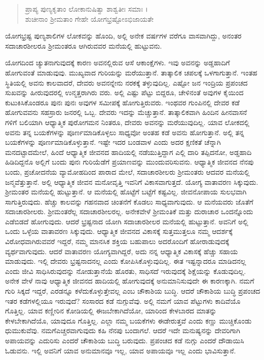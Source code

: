 \begin{verse}
ಪ್ರಾಪ್ಯ ಪುಣ್ಯಕೃತಾಂ ಲೋಕಾನುಷಿತ್ವಾ ಶಾಶ್ವತೀಃ ಸಮಾಃ ।\\ಶುಚೀನಾಂ ಶ್ರೀಮತಾಂ ಗೇಹೇ ಯೋಗಭ್ರಷ್ಟೋಽಭಿಜಾಯತೇ 
\end{verse}

{\small ಯೋಗಭ್ರಷ್ಟ ಪುಣ್ಯಶಾಲಿಗಳ ಲೋಕವನ್ನು ಹೊಂದಿ, ಅಲ್ಲಿ ಅನೇಕ ವರ್ಷಗಳ ವರೆಗೂ ವಾಸವಾಗಿದ್ದು, ಅನಂತರ ಸದಾಚಾರಶೀಲರೂ ಶ್ರೀಮಂತರೂ ಆಗಿರುವವರ ಮನೆಯಲ್ಲಿ ಹುಟ್ಟುವನು.}

ಯೋಗದಿಂದ ಚ್ಯುತನಾಗುವುದಕ್ಕೆ ಕಾರಣ ಅವನಲ್ಲಿರುವ ಆಸೆ ಆಕಾಂಕ್ಷೆಗಳು. ಇವು ಅವನನ್ನು ಅಡ್ಡಹಾದಿಗೆ ಹೋಗುವಂತೆ ಮಾಡುವುವು. ಮುಖ್ಯವಾದ ಗುರಿಯನ್ನು ಮರೆಯುತ್ತಾನೆ. ತಾತ್ಕಾಲಿಕ ಚಪಲಕ್ಕೆ ಒಳಗಾಗುತ್ತಾನೆ. ಇಂತಹ ಸ್ಥಿತಿಯಲ್ಲಿ ಅವನು ಕಾಲವಾದರೆ, ದೇವರು ಅವನನ್ನೇನು ನರಕಕ್ಕೆ ತಳ್ಳುವುದಿಲ್ಲ. ಎಷ್ಟೋ ಜನ ಇಂದ್ರಿಯ ಪ್ರಪಂಚದ ಸುಖವನ್ನು ಹೀರುವುದರಲ್ಲಿ ಉನ್ಮತ್ತರಾಗಿರು ವರು. ಅಲ್ಲಿ ಎಷ್ಟು ಪೆಟ್ಟು ಬಿದ್ದರೂ, ಚೇಳಿನಂತೆ ಅವುಗಳ ಕೈಯಿಂದ ಕುಟುಕಿಸಿಕೊಂಡರೂ ಪುನಃ ಪುನಃ ಅವುಗಳ ಸಮೀಪಕ್ಕೆ ಹೋಗುತ್ತಿರುವರು. ಇಂಥವರ ಗುಂಪಿನಲ್ಲಿ ದೇವರ ಕಡೆ ಹೋಗುವವನು ಸಹಸ್ರಾರು ಜನರಲ್ಲಿ ಒಬ್ಬ. ದೇವರು ಇದನ್ನು ಮೆಚ್ಚುತ್ತಾನೆ. ತಾತ್ಕಾಲಿಕವಾಗಿ ಹಿಂದಿನ ಹೀನವಾಸನೆ ಗಳಿಗೆ ಬಲಿಯಾಗಿ ಆಧ್ಯಾತ್ಮಿಕ ಪುರೋಗಮನ ನಿಂತರೂ, ದೇವರು ಅವನನ್ನು ಮರೆಯುವುದಿಲ್ಲ. ಯಾವ ಲೋಕದಲ್ಲಿ ಅವನು ತನ್ನ ಬಯಕೆಗಳನ್ನು ಪೂರ್ಣಮಾಡಿಕೊಳ್ಳಲು ಸಾಧ್ಯವೋ ಅಂತಹ ಕಡೆ ಅವನು ಹೋಗುತ್ತಾನೆ. ಅಲ್ಲಿ ತನ್ನ ಬಯಕೆಗಳನ್ನು ಪೂರ್ಣಮಾಡಿಕೊಳ್ಳುತ್ತಾನೆ. ಇಷ್ಟೇ ಇದರ ಬಂಡವಾಳ ಎಂದು ಅದರ ಕ್ಷಣಿಕತೆ ಚೆನ್ನಾಗಿ ಮನದಟ್ಟಾದಮೇಲೆ, ಹಿಂದೆ ಆಧ್ಯಾತ್ಮಿಕ ಜೀವನದ ಹಾದಿಯಲ್ಲಿ ನಡೆಯುತ್ತಿದ್ದಾಗ ಎಲ್ಲಿ ದಾರಿ ತಪ್ಪಿದನೋ, ಅಡ್ಡಹಾದಿ ಹಿಡಿದಿದ್ದನೊ ಅಲ್ಲಿಗೆ ಬಂದು ಪುನಃ ಗುರಿಯೆಡೆಗೆ ಪ್ರಯಾಣವನ್ನು ಮುಂದುವರಿಸುವನು. ಆಧ್ಯಾತ್ಮಿಕ ಜೀವನದ ನೆನಪು ಬಂದು, ಪ್ರಚೋದನೆಯ ವ್ಯಾಮೋಹದಿಂದ ಪಾರಾದ ಮೇಲೆ, ಸದಾಚಾರಶೀಲರು ಶ್ರೀಮಂತರು ಆದವರ ಮನೆಯಲ್ಲಿ ಜನ್ಮವೆತ್ತುತ್ತಾನೆ. ಅಲ್ಲಿ ಆಧ್ಯಾತ್ಮಿಕ ಜೀವನ ಮನೋವೃತ್ತಿ ಇವನಿಗೆ ವಿಕಾಸವಾಗುತ್ತದೆ. ಯೋಗ್ಯ ವಾತಾವರಣ ಸಿಕ್ಕುವುದು. ಶ್ರೀಮಂತರ ಮನೆಯಲ್ಲಿ ಹುಟ್ಟುತ್ತಾನೆ. ಆ ಮನೆಯಲ್ಲಿ ಹೊಟ್ಟೆಗೆ ಬಟ್ಟೆಗೆ ಕಷ್ಟವಿಲ್ಲ. ಜೀವನೋಪಾಯ ಸುಲಭವಾಗಿ ಸಾಗುತ್ತಿರುವುದು. ಹೆಚ್ಚು ಕಾಲವನ್ನು ಗಹನವಾದ ಚಿಂತನೆಗೆ ಕೊಡಲು ಸಾಧ್ಯವಾಗುವುದು. ಆ ಮನೆಯವರು ಜೊತೆಗೆ ಸದಾಚಾರಶೀಲರು. ಶ್ರೀಮಂತರೆಲ್ಲ ಸದಾಚಾರಶೀಲರಲ್ಲ. ಅನೇಕವೇಳೆ ಶ್ರೀಮಂತಿಕೆ ಮತ್ತು ದುರಾಚಾರ ಒಂದನ್ನೊಂದು ಎಡೆಬಿಡದೆ ಹೋಗುವುದು. ಆದರೆ ಭ್ರಷ್ಟನಾದ ಯೋಗಿ ಸದಾಚಾರಶೀಲರ ಮನೆಯಲ್ಲಿ ಹುಟ್ಟುತ್ತಾನೆ. ಅವನಿಗೆ ಅಲ್ಲಿ ಒಂದು ಒಳ್ಳೆಯ ವಾತಾವರಣ ಸಿಕ್ಕುವುದು. ಆಧ್ಯಾತ್ಮಿಕ ಜೀವನದ ವಿಕಾಸಕ್ಕೆ ಸುತ್ತಮುತ್ತಲೂ ನಮ್ಮ ಆದರ್ಶಕ್ಕೆ ವಿರೋಧವಾಗಿರುವವರೆ ಇದ್ದರೆ, ನಮ್ಮ ಮಾನಸಿಕ ಶಕ್ತಿಯ ಬಹುಪಾಲು ಅದರೊಂದಿಗೆ ಹೋರಾಡುವುದಕ್ಕೆ ವ್ಯರ್ಥವಾಗುವುದು. ಆದರೆ ವಾತಾವರಣ ಯೋಗ್ಯವಾಗಿದ್ದರೆ, ಅದು ನನ್ನ ಆಧ್ಯಾತ್ಮಿಕ ವಿಕಾಸಕ್ಕೆ ಹೆಚ್ಚು ಸಹಾಯ ಮಾಡುವುದು. ಇಲ್ಲಿ ದೇವರು ಭ್ರಷ್ಟನಾದನಲ್ಲ ಎಂದು ಕೋಪಿಸಿಕೊಳ್ಳುವುದಿಲ್ಲ. ಈತ ಇಷ್ಟನ್ನಾದರೂ ಮಾಡಿದನಲ್ಲ ಎಂದು ಜೀವಿ ಸಾಧಿಸಿರುವುದನ್ನು ನೋಡುತ್ತಾನೆಯೆ ಹೊರತು, ಸಾಧಿಸದೆ ಇರುವುದಕ್ಕೆ ಶಿಕ್ಷೆಯನ್ನು ಕೊಡುವುದಿಲ್ಲ. ಅನೇಕ ವೇಳೆ ನಾವು ಆಧ್ಯಾತ್ಮಿಕ ಜೀವನದ ಹಾದಿಯಲ್ಲಿ ಹೋಗುವುದಕ್ಕೆ ಅನುಮಾನಿಸುವುದೇ ಈ ಕಾರಣಕ್ಕಾಗಿ. ನಮಗೆ ಗುರಿ ಸಿಕ್ಕದೆ ಇದ್ದರೆ, ಎರಡನ್ನೂ ಕಳೆದುಕೊಳ್ಳುತ್ತೇವಲ್ಲ ಎಂಬ ಚೌಕಾಶಿಯ ಬುದ್ಧಿ. ಆದರೆ ಚೌಕಾಶಿಯ ಬುದ್ಧಿ ಪ್ರಪಂಚದ ಇತರ ಕಡೆಗಳಲ್ಲಿಯೂ ಇರುವುದೆ? ಸಂಸಾರದ ಕಡೆ ನುಗ್ಗುವೆವು. ಅಲ್ಲಿ ನಮಗೆ ಯಾವ ಪೆಟ್ಟುಗಳು ಕಾದಿವೆಯೊ ಗೊತ್ತಿಲ್ಲ. ಯಾವ ಕಣ್ಣೀರಿನ ಕೋಡಿಯಲ್ಲಿ ಈಜಬೇಕಾಗಿದೆಯೋ, ಯಾರಿಂದ ಕೇಳಬಾರದ ಮಾತನ್ನು ಕೇಳಬೇಕಾಗಿದೆಯೊ, ಯಾವುದೂ ಗೊತ್ತಿಲ್ಲ. ಎಲ್ಲಾ ನಮ್ಮ ಬಯಕೆಗಳು ಈಡೇರುತ್ತವೆ ಎಂದು ಕಣ್ಣು ಮುಚ್ಚಿಕೊಂಡು ಧುಮುಕುವೆವು. ನಮಗೆಎಚ್ಚರವಾಗುವುದು ಕಹಿ ನೆನಪು ಬಂದಾಗಲೆ. ಆದರೆ ಇದೇ ಮನುಷ್ಯನನ್ನು ದೇವರಿಗಾಗಿ ಅಪಾಯವನ್ನು ಎದುರಿಸು ಎಂದರೆ ಚೌಕಾಶಿಯ ಬುದ್ಧಿ ಬರುವುದು. ಪ್ರಪಂಚದ ಕಡೆ ನುಗ್ಗು ಎಂದರೆ ದೌಡಾಯಿಸಿ ಓಡುವನು. ಇಲ್ಲಿ ಅವನಿಗೆ ಯಾವ ಅನುಮಾನವೂ ಇಲ್ಲ, ಯಾವ ಅಪಾಯವೂ ಇಲ್ಲ ಎಂದು ಭಾವಿಸುತ್ತಾನೆ.

